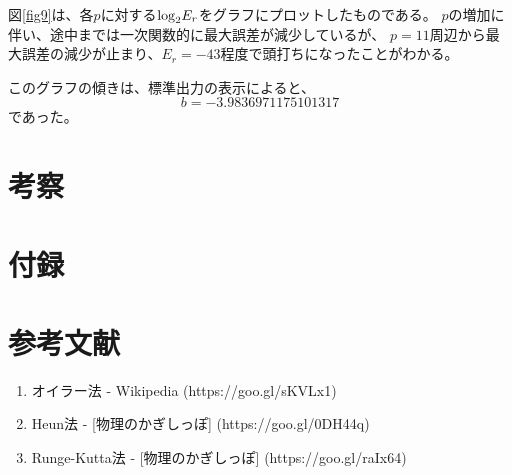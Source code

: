 \documentclass[11pt]{jsarticle}
\newcommand{\fr}[1]{図\ref{#1}}
\begin{document}
            \fr{fig9}は、各$p$に対する${\rm log}_2E_r$をグラフにプロットしたものである。
            $p$の増加に伴い、途中までは一次関数的に最大誤差が減少しているが、
            $p = 11$周辺から最大誤差の減少が止まり、$E_r = -43$程度で頭打ちになったことがわかる。

            このグラフの傾きは、標準出力の表示によると、
            \[
                b = -3.9836971175101317
            \]
            であった。

    \section{考察}

    \section{付録}

    \section{参考文献}
        \begin{enumerate}
            \item オイラー法 - Wikipedia (https://goo.gl/sKVLx1)
            \item Heun法 - [物理のかぎしっぽ] (https://goo.gl/0DH44q)
            \item Runge-Kutta法 - [物理のかぎしっぽ] (https://goo.gl/raIx64)
        \end{enumerate}
\end{document}
